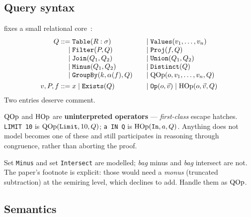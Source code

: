 
\subsection{Query syntax}

\QED{} fixes a small relational core~\cite[Fig.\ 2]{qed}:
\[
\begin{array}{r@{\;}l@{\qquad}r@{\;}l}
Q ::=& \texttt{Table}(R:\sigma) & \mid& \texttt{Values}(v_1,\dots,v_n)\\
\mid& \texttt{Filter}(P,Q) & \mid& \texttt{Proj}(f,Q)\\
\mid& \texttt{Join}(Q_1,Q_2) & \mid& \texttt{Union}(Q_1,Q_2)\\
\mid& \texttt{Minus}(Q_1,Q_2) & \mid& \texttt{Distinct}(Q)\\
\mid& \texttt{GroupBy}(k,\alpha(f),Q) & \mid& \qop(o,v_1,\dots,v_n,Q)\\[4pt]
v,P,f ::=& x \mid \texttt{Exists}(Q) & \mid& \texttt{Op}(o,\vec v) \mid \hop(o,\vec v,Q)
\end{array}
\]
Two entries deserve comment.

$\mathrm{QOp}$ and $\mathrm{HOp}$ are \textbf{uninterpreted operators} --- \emph{first-class} escape
hatches. \lstinline|LIMIT 10| is $\mathrm{QOp}(\texttt{Limit},10,Q)$; \lstinline|a IN Q| is
$\mathrm{HOp}(\texttt{In},a,Q)$. Anything \QED{} does not model becomes one of these and still
participates in reasoning through congruence, rather than aborting the proof.

\begin{remark}
Set \texttt{Minus} and set \texttt{Intersect} are modelled; \emph{bag} minus and
\emph{bag} intersect are not. The paper's footnote is explicit: those would need a
\emph{monus} (truncated subtraction) at the semiring level, which \QED{} declines to add.
Handle them as $\mathrm{QOp}$.
\end{remark}

\subsection{Semantics}
\label{sec:qsem}

